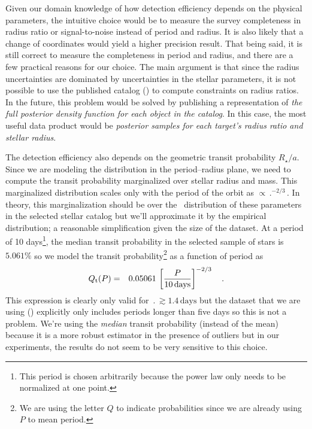 Given our domain knowledge of how detection efficiency depends on the physical
parameters, the intuitive choice would be to measure the survey completeness
in radius ratio or signal-to-noise instead of period and radius.
It is also likely that a change of coordinates would yield a higher precision
result.
That being said, it is still correct to measure the completeness in period and
radius, and there are a few practical reasons for our choice.
The main argument is that since the radius uncertainties are dominated by
uncertainties in the stellar parameters, it is not possible to use the
published catalog (\citealt{Petigura:2013}) to compute constraints on radius
ratios.
In the future, this problem would be solved by publishing a representation of
\emph{the full posterior density function for each object in the catalog}.
In this case, the most useful data product would be \emph{posterior samples
for each target's radius ratio and stellar radius}.

The detection efficiency also depends on the geometric transit probability
$R_\star/a$.
Since we are modeling the distribution in the period--radius plane, we need to
compute the transit probability marginalized over stellar radius and mass.
This marginalized distribution scales only with the period of the orbit as
$\propto \period^{-2/3}$.
In theory, this marginalization should be over the \True\ distribution of
these parameters in the selected stellar catalog but we'll approximate it by
the empirical distribution; a reasonable simplification given the size of the
dataset.
At a period of 10 days\footnote{This period is chosen arbitrarily because the
power law only needs to be normalized at one point.}, the median transit
probability in the selected sample of stars is $5.061\%$ so we model the
transit probability\footnote{We are using the letter $Q$ to indicate
probabilities since we are already using $P$ to mean period.} as a function of
period as
\begin{eqnarray}\eqlabel{transitprob}
\transitprob (\period) &=&
    0.05061\,\left[\frac{\period}{10\,\mathrm{days}}\right]^{-2/3} \quad.
\end{eqnarray}
This expression is clearly only valid for $\period \gtrsim 1.4\,\mathrm{days}$
but the dataset that we are using (\citealt{Petigura:2013}) explicitly only
includes periods longer than five days so this is not a problem.
We're using the \emph{median} transit probability (instead of the mean)
because it is a more robust estimator in the presence of outliers but in our
experiments, the results do not seem to be very sensitive to this choice.

